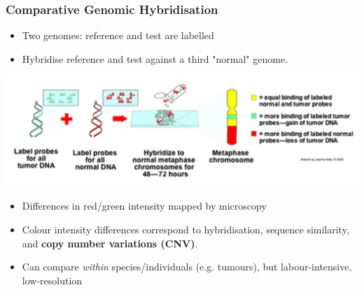 
%
\begin{frame}
  \frametitle{Comparative Genomic Hybridisation}
  \begin{itemize}
    \item Two genomes: \textcolor{RawSienna}{reference} and \textcolor{hutton_green}{test} are labelled
    \item Hybridise \textcolor{RawSienna}{reference} and \textcolor{hutton_green}{test} against a third \textcolor{hutton_blue}{"normal"} genome.
  \end{itemize}
  \begin{center}
    \includegraphics[width=\textwidth]{images/cgh}
  \end{center}  
  \begin{itemize}
    \item Differences in \textcolor{RawSienna}{red}/\textcolor{hutton_green}{green} intensity mapped by microscopy
    \item \textcolor{hutton_blue}{Colour intensity differences correspond to hybridisation, sequence similarity, and \textbf{copy number variations (CNV)}.}
    \item \textcolor{hutton_purple}{Can compare \textit{within} species/individuals (e.g. tumours), but labour-intensive, low-resolution}
  \end{itemize}  
\end{frame}

